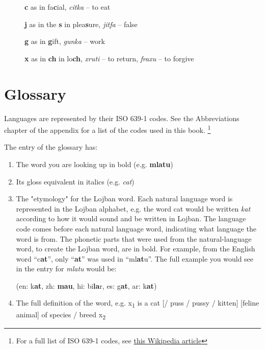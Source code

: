 \documentclass[12pt]{book}
\begin{document}
\begin{description}
\item[ ] \textbf{c} as in fa\textbf{c}ial, \emph{citka} -- to eat
\item[ ] \textbf{j} as in the \textbf{s} in plea\textbf{s}ure, \emph{jitfa} -- false
\item[ ] \textbf{g} as in \textbf{g}ift, \emph{gunka} -- work
\item[ ] \textbf{x} as in \textbf{ch} in lo\textbf{ch}, \emph{xruti} -- to return, \emph{fraxu} -- to forgive
\end{description}




\mainmatter






\appendix

\chapter{Glossary}

Languages are represented by their ISO 639-1 codes. See the Abbreviations chapter of the appendix for a list of the codes used in this book. \footnote{For a full list of ISO 639-1 codes, see \href{https://en.wikipedia.org/wiki/List_of_ISO_639-1_codes}{this Wikipedia article}}

The entry of the glossary has:

\begin{enumerate}
\item The word you are looking up in bold (e.g. \textbf{mlatu})
\item Its gloss equivalent in italics (e.g. \textit{cat}) 
\item The "etymology" for the Lojban word. Each natural language word is represented in the Lojban alphabet, e.g. the word cat would be written \emph{kat} according to how it would sound and be written in Lojban. The language code comes before each natural language word, indicating what language the word is from. The phonetic parts that were used from the natural-language word, to create the Lojban word, are in bold. For example, from the English word ``c\textbf{at}'', only ``\textbf{at}'' was used in ``ml\textbf{at}u''. The full example you would see in the entry for \emph{mlatu} would be: 

(en: k\textbf{at}, zh: \textbf{mau}, hi: bi\textbf{la}r, es: g\textbf{at}, ar: k\textbf{at})
\item The full definition of the word, e.g. x\textsubscript{1} is a cat [/ puss / pussy / kitten] [feline animal] of species / breed x\textsubscript{2}
\end{enumerate}
\end{document}
